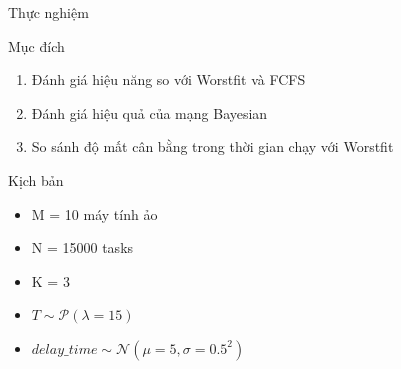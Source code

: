 \documentclass[11pt,xcolor={dvipsnames}, aspectratio=169]{beamer}
\begin{document}
\begin{frame}
{Thực nghiệm}

\begin{block}
{Mục đích}
	\begin{enumerate}
		\item Đánh giá hiệu năng so với Worstfit và FCFS
		\item Đánh giá hiệu quả của mạng Bayesian
		\item So sánh độ mất cân bằng trong thời gian chạy với Worstfit	
	\end{enumerate}
\end{block}

\begin{block}
{Kịch bản}
\begin{itemize}
	\item M = 10 máy tính ảo 
	\item N = 15000 tasks
	\item K = 3
	\item $T \sim \mathcal{P}(\lambda = 15)$
	\item $delay\_time \sim \mathcal{N}(\mu = 5, \sigma = 0.5^{2})$
\end{itemize}
\end{block}

\end{frame}
\end{document}

